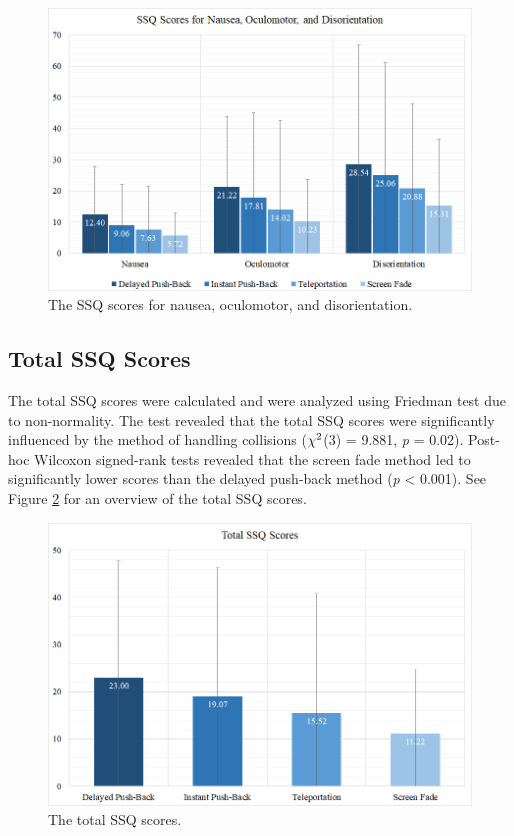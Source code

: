 \begin{figure}[ph]
\centering
\includegraphics[width=1\textwidth]{img/ssq_secondary.png}
\caption{The SSQ scores for nausea, oculomotor, and disorientation.}
\label{fig:ssq_secondary}
\end{figure}

\subsection{Total SSQ Scores}

The total SSQ scores were calculated and were analyzed using Friedman test due to non-normality. The test revealed that the total SSQ scores were significantly influenced by the method of handling collisions (\textit{$\chi\textsuperscript{2}$}(3) = 9.881, \textit{p} = 0.02). Post-hoc Wilcoxon signed-rank tests revealed that the screen fade method led to significantly lower scores than the delayed push-back method (\textit{p} < 0.001). See Figure \ref{fig:ssq_total} for an overview of the total SSQ scores.

\begin{figure}[ph]
\centering
\includegraphics[width=1\textwidth]{img/ssq_total.png}
\caption{The total SSQ scores.}
\label{fig:ssq_total}
\end{figure}

